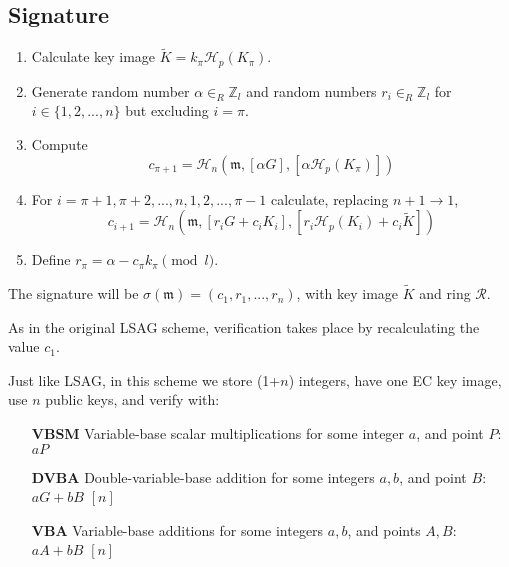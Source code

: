 \subsection*{Signature}


\begin{enumerate}
	\item Calculate key image \(\tilde{K} = k_\pi \mathcal{H}_p(K_\pi)\).
	
	\item Generate random number \(\alpha \in_R \mathbb{Z}_l\) and random numbers  \(r_i \in_R \mathbb{Z}_l\) for \(i \in \{1, 2, ..., n\}\) but excluding \(i = \pi\).
	
	\item Compute
	\[c_{\pi+1} = \mathcal{H}_n(\mathfrak{m}, [\alpha G], [\alpha \mathcal{H}_p(K_\pi)])\]
	
	\item For \(i = \pi+1, \pi+2, ..., n, 1, 2, ..., \pi-1\) calculate, replacing \(n + 1 \rightarrow 1\),\vspace{.2cm}
	\[  c_{i+1} = \mathcal{H}_n(\mathfrak{m}, [r_i G + c_i K_i], [r_i \mathcal{H}_p(K_i) + c_i \tilde{K}])  \] 
	
	
	\item Define \(r_\pi = \alpha - c_\pi k_\pi \pmod l\).
	
\end{enumerate}

The signature will be \(\sigma(\mathfrak{m}) = (c_1, r_1, ..., r_n) \), with key image $\tilde{K}$ and ring $\mathcal{R}$.

As in the original LSAG scheme, verification takes place by recalculating the value \(c_1\).

Just like LSAG, in this scheme we store (1+$n$) integers, have one EC key image, use $n$ public keys, and verify with:

\begin{itemize}
    \setlength\itemsep{\listspace}
    \item [\textbf{VBSM}] Variable-base scalar multiplications for some integer $a$, and point $P$: $a P$ \quad [1]
    \item [\textbf{DVBA}] Double-variable-base addition for some integers $a, b$, and point $B$: $a G + b B$ \quad \([n]\)
    \item [\textbf{VBA}] Variable-base additions for some integers $a, b$, and points $A, B$: $a A + b B$ \quad \([n]\)
\end{itemize}

